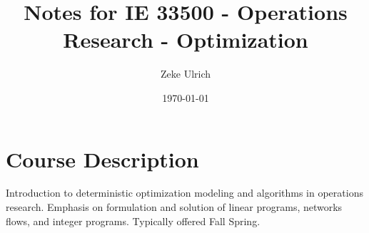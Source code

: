 \documentclass[nobib]{tufte-handout}
\title{Notes for IE 33500 - Operations Research - Optimization }
\author{Zeke Ulrich}
\date{\today}
\begin{document}
\maketitle

\tableofcontents

\section{Course Description}
Introduction to deterministic optimization modeling and algorithms in operations research. Emphasis on formulation and solution of linear programs, networks flows, and integer programs. Typically offered Fall Spring.


\pagebreak



\end{document}

